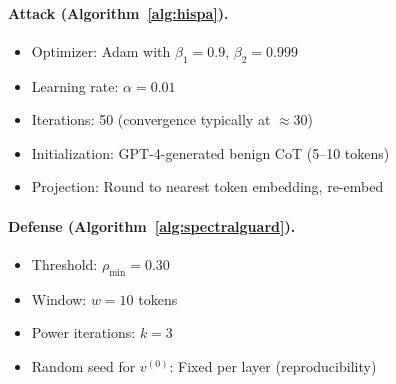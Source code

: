 \documentclass[10pt,twocolumn]{article}
\begin{document}
\vspace{-0.3em}
\paragraph{Attack (Algorithm~\ref{alg:hispa}).}
\begin{itemize}[nosep]
\item Optimizer: Adam with $\beta_1=0.9$, $\beta_2=0.999$
\item Learning rate: $\alpha=0.01$
\item Iterations: 50 (convergence typically at $\approx 30$)
\item Initialization: GPT-4-generated benign CoT (5--10 tokens)
\item Projection: Round to nearest token embedding, re-embed
\end{itemize}

\vspace{-0.3em}
\paragraph{Defense (Algorithm~\ref{alg:spectralguard}).}
\begin{itemize}[nosep]
\item Threshold: $\rho_{\min}=0.30$
\item Window: $w=10$ tokens
\item Power iterations: $k=3$
\item Random seed for $v^{(0)}$: Fixed per layer (reproducibility)
\end{itemize}

\vspace{-0.3em}
\end{document}
